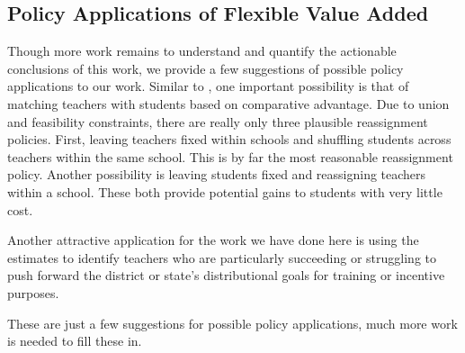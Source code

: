 \documentclass[letterpaper,12pt]{article}
\begin{document}



\subsection{Policy Applications of Flexible Value Added}

Though more work remains to understand and quantify the actionable conclusions of this work, we provide a few suggestions of possible policy applications to our work. Similar to \cite{condie2014teacher}, one important possibility is that of matching teachers with students based on comparative advantage. Due to union and feasibility constraints, there are really only three plausible reassignment policies. First, leaving teachers fixed within schools and shuffling students across teachers within the same school. This is by far the most reasonable reassignment policy. Another possibility is leaving students fixed and reassigning teachers within a school. These both provide potential gains to students with very little cost.

Another attractive application for the work we have done here is using the estimates to identify teachers who are particularly succeeding or struggling to push forward the district or state's distributional goals for training or incentive purposes.

These are just a few suggestions for possible policy applications, much more work is needed to fill these in.
 




\end{document}
